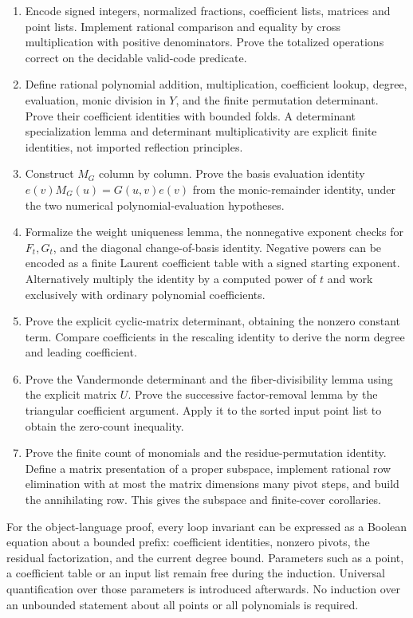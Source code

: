 \begin{enumerate}
\item Encode signed integers, normalized fractions, coefficient lists,
matrices and point lists.  Implement rational comparison and equality by
cross multiplication with positive denominators.  Prove the totalized
operations correct on the decidable valid-code predicate.
\item Define rational polynomial addition, multiplication, coefficient
lookup, degree, evaluation, monic division in $Y$, and the finite
permutation determinant.  Prove their coefficient identities with
bounded folds.  A determinant specialization lemma and determinant
multiplicativity are explicit finite identities, not imported reflection
principles.
\item Construct $M_G$ column by column.  Prove the basis evaluation
identity $e(v)M_G(u)=G(u,v)e(v)$ from the monic-remainder identity,
under the two numerical polynomial-evaluation hypotheses.
\item Formalize the weight uniqueness lemma, the nonnegative exponent
checks for $F_t,G_t$, and the diagonal change-of-basis identity.  Negative
powers can be encoded as a finite Laurent coefficient table with a signed
starting exponent.  Alternatively multiply the identity by a computed
power of $t$ and work exclusively with ordinary polynomial coefficients.
\item Prove the explicit cyclic-matrix determinant, obtaining the nonzero
constant term.  Compare coefficients in the rescaling identity to derive
the norm degree and leading coefficient.
\item Prove the Vandermonde determinant and the fiber-divisibility lemma
using the explicit matrix $U$.  Prove the successive factor-removal
lemma by the triangular coefficient argument.  Apply it to the sorted
input point list to obtain the zero-count inequality.
\item Prove the finite count of monomials and the residue-permutation
identity.  Define a matrix presentation of a proper subspace, implement
rational row elimination with at most the matrix dimensions many pivot
steps, and build the annihilating row.  This gives the subspace and
finite-cover corollaries.
\end{enumerate}

For the object-language proof, every loop invariant can be expressed as
a Boolean equation about a bounded prefix: coefficient identities,
nonzero pivots, the residual factorization, and the current degree bound.
Parameters such as a point, a coefficient table or an input list remain
free during the induction.  Universal quantification over those
parameters is introduced afterwards.  No induction over an unbounded
statement about all points or all polynomials is required.

